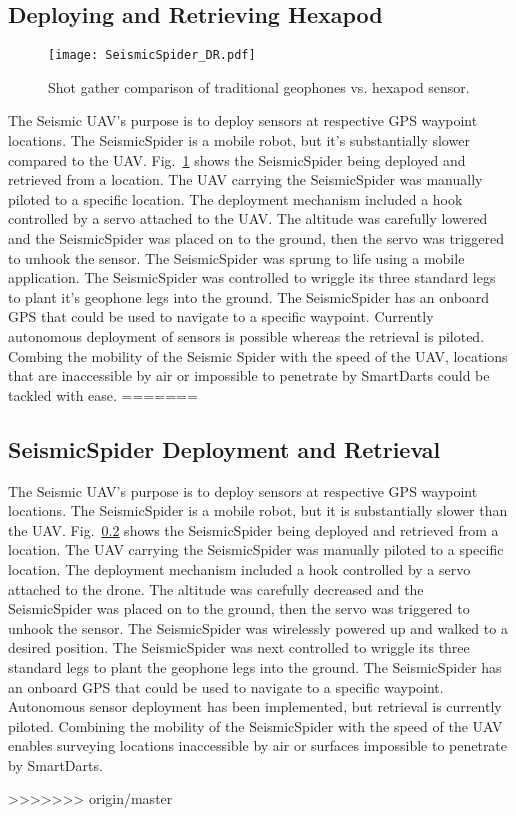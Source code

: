 \subsection{Deploying and Retrieving Hexapod}
\begin{figure} \centering
  {\texttt{[image: SeismicSpider\_DR.pdf]}}
 \caption{Shot gather comparison of traditional geophones vs. hexapod sensor. 
 \label{fig:SeismicSpider_DR}}
\end{figure}
The Seismic UAV’s purpose is to deploy sensors at respective GPS waypoint locations. The SeismicSpider is a mobile robot, but it’s substantially slower compared to the UAV. Fig.~\ref{fig:SeismicSpider_DR} shows the SeismicSpider being deployed and retrieved from a location. The UAV carrying the SeismicSpider was manually piloted to a specific location. The deployment mechanism included a hook controlled by a servo attached to the UAV. The altitude was carefully lowered and the SeismicSpider was placed on to the ground, then the servo was triggered to unhook the sensor.  The SeismicSpider was sprung to life using a mobile application. The SeismicSpider was controlled to wriggle its three standard legs to plant it’s  geophone legs into the ground.  The SeismicSpider has an onboard GPS that could be used to navigate to a specific waypoint.  Currently autonomous deployment of sensors is possible whereas the retrieval is piloted. Combing the mobility of the Seismic Spider with the speed of the UAV, locations that are inaccessible by air or impossible to penetrate by SmartDarts could be tackled with ease.
=======
\subsection{SeismicSpider Deployment and Retrieval}

The Seismic UAV's purpose is to deploy sensors at respective GPS waypoint locations. The SeismicSpider is a mobile robot, but it is substantially slower than the UAV. Fig.~\ref{} shows the SeismicSpider being deployed and retrieved from a location. The UAV carrying the SeismicSpider was manually piloted to a specific location. The deployment mechanism included a hook controlled by a servo attached to the drone. The altitude was carefully decreased and the SeismicSpider was placed on to the ground, then the servo was triggered to unhook the sensor.  The SeismicSpider was wirelessly powered up and walked to a desired position. The SeismicSpider was next controlled to wriggle its three standard legs to plant the geophone legs into the ground.  The SeismicSpider has an onboard GPS that could be used to navigate to a specific waypoint.  Autonomous sensor deployment has been implemented, but retrieval is currently piloted.  Combining the mobility of the SeismicSpider with the speed of the UAV enables surveying locations inaccessible by air or surfaces impossible to penetrate by SmartDarts.



>>>>>>> origin/master
